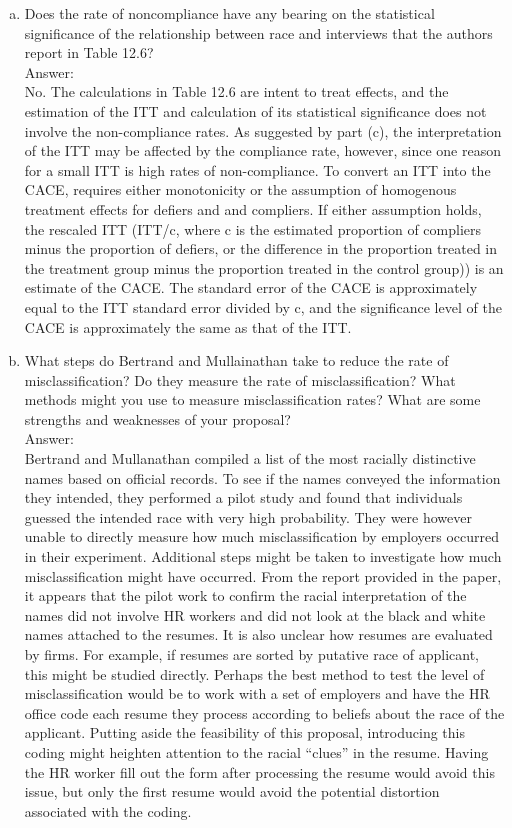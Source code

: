 \documentclass[11pt,notitlepage]{article}\usepackage[]{graphicx}\usepackage[]{color}
\begin{document}
\begin{enumerate}[a)]
\item Does the rate of noncompliance have any bearing on the statistical significance of the relationship between race and interviews that the authors report in Table 12.6?\\
Answer:\\
No. The calculations in Table 12.6 are intent to treat effects, and the estimation of the ITT and calculation of its statistical significance does not involve the non-compliance rates. As suggested by part (c), the interpretation of the ITT may be affected by the compliance rate, however, since one reason for a small ITT is high rates of non-compliance. To convert an ITT into the CACE, requires either monotonicity or the assumption of homogenous treatment effects for defiers and and compliers. If either assumption holds, the rescaled ITT (ITT/c, where c is the estimated proportion of compliers minus the proportion of defiers, or the difference in the proportion treated in the treatment group minus the proportion treated in the control group)) is an estimate of the CACE. The standard error of the CACE is approximately equal to the ITT standard error divided by c, and the significance level of the CACE is approximately the same as that of the ITT.   
\item What steps do Bertrand and Mullainathan take to reduce the rate of misclassification? Do they measure the rate of misclassification? What methods might you use to measure misclassification rates? What are some strengths and weaknesses of your proposal?\\
Answer:\\
Bertrand and Mullanathan compiled a list of the most racially distinctive names based on official records. To see if the names conveyed the information they intended, they performed a pilot study and found that individuals guessed the intended race with very high probability. They were however unable to directly measure how much misclassification by employers occurred in their experiment. Additional steps might be taken to investigate how much misclassification might have occurred. From the report provided in the paper, it appears that the pilot work to confirm the racial interpretation of the names did not involve HR workers and did not look at the black and white names attached to the resumes. It is also unclear how resumes are evaluated by firms. For example, if resumes are sorted by putative race of applicant, this might be studied directly.    
Perhaps the best method to test the level of misclassification would be to work with a set of employers and have the HR office code each resume they process according to beliefs about the race of the applicant. Putting aside the feasibility of this proposal, introducing this coding might heighten attention to the racial ``clues'' in the resume. Having the HR worker fill out the form after processing the resume would avoid this issue, but only the first resume would avoid the potential distortion associated with the coding. 


\end{enumerate}
\end{document}

